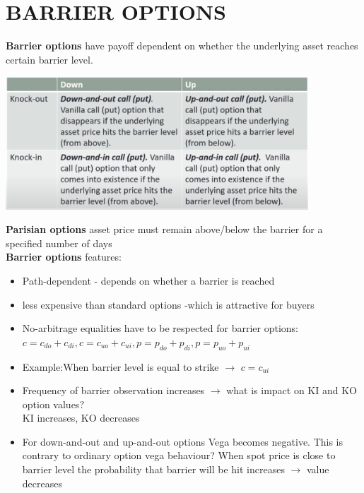 \documentclass{article}
\begin{document}
\section{BARRIER OPTIONS}
{\bf Barrier options} have payoff dependent on whether the underlying asset reaches certain barrier level.\\
\begin{center}
\includegraphics[width=0.85\textwidth]{Barrier_options.png}
\end{center}
{\bf Parisian options} asset price must remain above/below the barrier for a specified number of days\\
{\bf Barrier options} features:
\begin{itemize}
    \item Path-dependent  - depends on whether a barrier is reached 
    \item less expensive than standard options -which is attractive for buyers
    \item No-arbitrage equalities have to be respected for barrier options:\\
    $c = c_{do} + c_{di}, c = c_{uo} + c_{ui}, p = p_{do} + p_{di}, p = p_{uo} + p_{ui}$
    \item Example:When barrier level is equal to strike $\rightarrow$ $c = c_{ui}$
    \item Frequency of barrier observation increases $\rightarrow$ what is impact on KI and KO option values? \\KI increases, KO decreases
    \item For down-and-out and up-and-out options Vega becomes negative. This is contrary to ordinary option vega behaviour? When spot price is close to barrier level the probability that barrier will be hit increases $\rightarrow$ value decreases
\end{itemize}
\newpage
\end{document}
